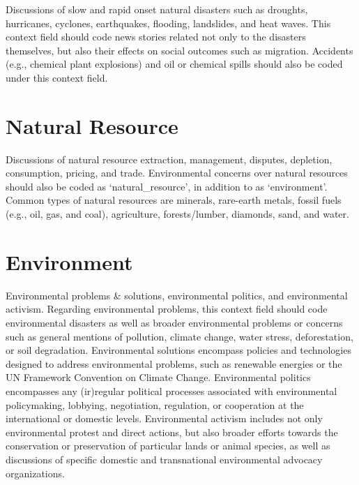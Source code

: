 \documentclass[11pt]{report}
\begin{document}
Discussions of slow and rapid onset natural disasters such as droughts, hurricanes, cyclones, earthquakes, flooding, landslides, and heat waves. This context field should code news stories related not only to the disasters themselves, but also their effects on social outcomes such as migration. Accidents (e.g., chemical plant explosions) and oil or chemical spills should also be coded under this context field.



\section{Natural Resource}\label{context:natural-resource}

Discussions of natural resource extraction, management, disputes, depletion, consumption, pricing, and trade. Environmental concerns over natural resources should also be coded as `natural\_resource', in addition to as `environment'. Common types of natural resources are minerals, rare-earth metals, fossil fuels (e.g., oil, gas, and coal), agriculture, forests/lumber, diamonds, sand, and water.



\section{Environment}\label{context:environment}

Environmental problems \& solutions, environmental politics, and environmental activism. Regarding environmental problems, this context field should code environmental disasters as well as broader environmental problems or concerns such as general mentions of pollution, climate change, water stress, deforestation, or soil degradation. Environmental solutions encompass policies and technologies designed to address environmental problems, such as renewable energies or the UN Framework Convention on Climate Change. Environmental politics encompasses any (ir)regular political processes associated with environmental policymaking, lobbying, negotiation, regulation, or cooperation at the international or domestic levels. Environmental activism includes not only environmental protest and direct actions, but also broader efforts towards the conservation or preservation of particular lands or animal species, as well as discussions of specific domestic and transnational environmental advocacy organizations.
\end{document}
